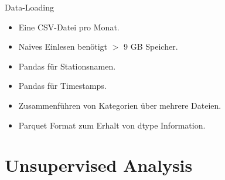 \begin{frame}{Data-Loading}
{
\begin{itemize}
\item Eine CSV-Datei pro Monat.
\item Naives Einlesen benötigt $>$ 9 GB Speicher.
\end{itemize}
}
{
\begin{itemize}
\item Pandas  für Stationsnamen.
\item Pandas  für Timestamps.
\item Zusammenführen von Kategorien über mehrere Dateien.
\item Parquet Format zum Erhalt von dtype Information.
\end{itemize}
}
\end{frame}

\section{Unsupervised Analysis}


